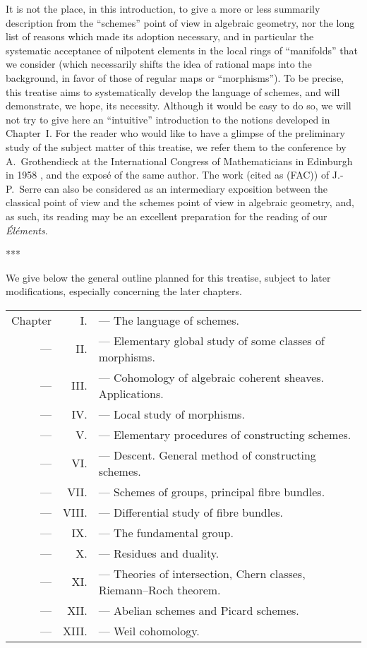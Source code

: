 \documentclass[openany,oneside]{amsbook}
\theoremstyle{ega-env-style}
\theoremstyle{ega-thm-env-style}
\theoremstyle{ega-defn-env-style}
\newcommand{\oldpage}[2][--]{{\marginpar{\textbf{#1}~|~#2}}\ignorespaces}
\def\sectionbreak{\begin{center}***\end{center}}
\begin{document}
It is not the place, in this introduction, to give a more or less summarily description from the ``schemes'' point of view in algebraic geometry, nor the long list of reasons which made its adoption necessary, and in particular the systematic acceptance of nilpotent elements in the local rings of ``manifolds'' that we consider (which necessarily shifts the idea of rational maps into the background, in favor of those of regular maps or ``morphisms'').
To be precise, this treatise aims to systematically develop the language of schemes, and will demonstrate, we hope, its necessity.
Although it would be easy to do so,\oldpage[I]{6} we will not try to give here an ``intuitive'' introduction to the notions developed in Chapter~I.
For the reader who would like to have a glimpse of the preliminary study of the subject matter of this treatise, we refer them to the conference by A.~Grothendieck at the International Congress of Mathematicians in Edinburgh in 1958 \cite{I-7}, and the expos\'e \cite{I-8} of the same author.
The work \cite{I-14} (cited as (FAC)) of J.-P.~Serre can also be considered as an intermediary exposition between the classical point of view and the schemes point of view in algebraic geometry, and, as such, its reading may be an excellent preparation for the reading of our \emph{\'El\'ements}.

\sectionbreak

We give below the general outline planned for this treatise, subject to later modifications, especially concerning the later chapters.

\begin{tabular}{rrl}
Chapter & I. & --- The language of schemes.\\
--- & II. & --- Elementary global study of some classes of morphisms.\\
--- & III. & --- Cohomology of algebraic coherent sheaves. Applications.\\
--- & IV. & --- Local study of morphisms.\\
--- & V. & --- Elementary procedures of constructing schemes.\\
--- & VI. & --- Descent. General method of constructing schemes.\\
--- & VII. & --- Schemes of groups, principal fibre bundles.\\
--- & VIII. & --- Differential study of fibre bundles.\\
--- & IX. & --- The fundamental group.\\
--- & X. & --- Residues and duality.\\
--- & XI. & --- Theories of intersection, Chern classes,
Riemann--Roch theorem.\\
--- & XII. & --- Abelian schemes and Picard schemes.\\
--- & XIII. & --- Weil cohomology.
\end{tabular}\\
\end{document}

